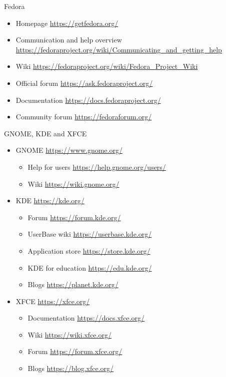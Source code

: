 \documentclass[compress, ucs, xelatex, 11pt, xcolor=svgnames, aspectratio=169,
	hyperref={
		bookmarks=true,
		unicode=true,
		colorlinks=true,
		pdftitle={Linux, command line and MetaCentrum},
		plainpages=false,
		pdfauthor={Vojtech Zeisek},
		pdfsubject={Course about use of Linux command line, writing shell scripts and using MetaCentrum of CESNET},
		pdfcreator={XeLaTeX},
		pdfkeywords={Linux, GNU, BASH, shell, command line, MetaCentrum},
		linkcolor=DarkRed, %
		anchorcolor=DarkBlue, %
		citecolor=Indigo, %
		filecolor=NavyBlue, %
		menucolor=DarkMagenta, %
		urlcolor=DarkBlue, %
		pdftex},
	url={hyphens, lowtilde} %
	]{beamer}
\begin{document}
\begin{frame}{Fedora}
	\begin{itemize}
		\item Homepage \url{https://getfedora.org/}
		\item Communication and help overview \url{https://fedoraproject.org/wiki/Communicating_and_getting_help}
		\item Wiki \url{https://fedoraproject.org/wiki/Fedora_Project_Wiki}
		\item Official forum \url{https://ask.fedoraproject.org/}
		\item Documentation \url{https://docs.fedoraproject.org/}
		\item Community forum \url{https://fedoraforum.org/}
	\end{itemize}
\end{frame}

\begin{frame}{GNOME, KDE and XFCE}
	\begin{itemize}
		\item GNOME \url{https://www.gnome.org/}
		\begin{itemize}
			\item Help for users \url{https://help.gnome.org/users/}
			\item Wiki \url{https://wiki.gnome.org/}
		\end{itemize}
		\item KDE \url{https://kde.org/}
		\begin{itemize}
			\item Forum \url{https://forum.kde.org/}
			\item UserBase wiki \url{https://userbase.kde.org/}
			\item Application store \url{https://store.kde.org/}
			\item KDE for education \url{https://edu.kde.org/}
			\item Blogs \url{https://planet.kde.org/}
		\end{itemize}
		\item XFCE \url{https://xfce.org/}
		\begin{itemize}
			\item Documentation \url{https://docs.xfce.org/}
			\item Wiki \url{https://wiki.xfce.org/}
			\item Forum \url{https://forum.xfce.org/}
			\item Blogs \url{https://blog.xfce.org/}
		\end{itemize}
	\end{itemize}
\end{frame}
\end{document}
